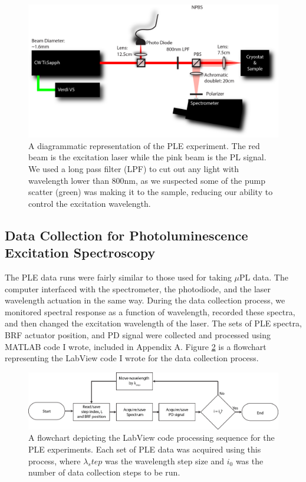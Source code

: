 \begin{figure}[h!]
\centering
\includegraphics[width = 1\textwidth]{PLE.png}
\caption{ \doublespacing A diagrammatic representation of the PLE experiment. The red beam is the excitation laser while the pink beam is the PL signal. We used a long pass filter (LPF) to cut out any light with wavelength lower than 800nm, as we suspected some of the pump scatter (green) was making it to the sample, reducing our ability to control the excitation wavelength.}
\label{PLE}
\end{figure}

\subsection{Data Collection for Photoluminescence Excitation Spectroscopy}
The PLE data runs were fairly similar to those used for taking $\mu$PL data. The computer interfaced with the spectrometer, the photodiode, and the laser wavelength actuation in the same way. During the data collection process, we monitored spectral response as a function of wavelength, recorded these spectra, and then changed the excitation wavelength of the laser. The sets of PLE spectra, BRF actuator position, and PD signal were collected and processed using MATLAB code I wrote, included in Appendix A. Figure \ref{flowitple} is a flowchart representing the LabView code I wrote for the data collection process.

\begin{figure}[h!]
\centering
\includegraphics[width = 1\textwidth]{pleSoftflow.png}
\caption{ \doublespacing A flowchart depicting the LabView code processing sequence for the PLE experiments. Each set of PLE data was acquired using this process, where $\lambda_step$ was the wavelength step size and $i_0$ was the number of data collection steps to be run.}
\label{flowitple}
\end{figure}

